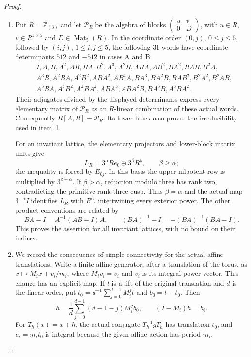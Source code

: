 \documentclass[11pt,a4paper]{article}
\theoremstyle{definition}
\begin{document}
\begin{proof}
\begin{enumerate}[label=\arabic*.]
\item Put $R=\mathbb Z_{(3)}$ and let $\mathcal P_R$ be the algebra
of blocks $\left(\begin{smallmatrix}u&v\\0&D\end{smallmatrix}\right)$,
with $u\in R$, $v\in R^{1\times5}$ and $D\in\operatorname{Mat}_5(R)$.
In the coordinate order $(0,j)$, $0\leq j\leq5$, followed by
$(i,j)$, $1\leq i,j\leq5$, the following $31$ words have coordinate
determinants $512$ and $-512$ in cases A and B:
\[
\begin{aligned}
&I,A,B,A^2,AB,BA,B^2,A^3,A^2B,ABA,AB^2,BA^2,BAB,B^2A,\\
&A^3B,A^2BA,A^2B^2,ABA^2,AB^2A,BA^3,BA^2B,BAB^2,B^2A^2,B^2AB,\\
&A^3BA,A^3B^2,A^2BA^2,ABA^3,ABA^2B,BA^3B,A^3BA^2.
\end{aligned}
\]
Their adjugates divided by the displayed determinants express
every elementary matrix of $\mathcal P_R$ as an $R$-linear
combination of these actual words.  Consequently $R[A,B]=\mathcal P_R$.
Its lower block also proves the irreducibility used in item~1.

For an invariant lattice, the elementary projectors and lower-block
matrix units give
\[
 L_R=3^\alpha Re_0\oplus3^\beta R^5,\qquad \beta\geq\alpha;
\]
the inequality is forced by $E_{0j}$.  In this basis the upper
nilpotent row is multiplied by $3^{\beta-\alpha}$.  If
$\beta>\alpha$, reduction modulo three has rank two, contradicting
the primitive rank-three cusp.  Thus $\beta=\alpha$ and the actual
map $3^{-\alpha}I$ identifies $L_R$ with $R^6$, intertwining every
exterior power.  The other product conventions are related by
\[
 BA-I=A^{-1}(AB-I)A,\qquad
 (BA)^{-1}-I=-(BA)^{-1}(BA-I).
\]
This proves the assertion for all invariant lattices, with no
bound on their indices.

\item We record the consequence of simple connectivity for the
actual affine translations.  Write a finite affine generator,
after a translation of the torus, as
$x\mapsto M_ix+v_i/m_i$, where $M_iv_i=v_i$ and $v_i$ is its
integral power vector.  This change has an explicit map.  If $t$
is a lift of the original translation and $d$ is the linear order,
put $t_0=d^{-1}\sum_{j=0}^{d-1}M_i^jt$ and $b_0=t-t_0$.
Then
\[
 h=\frac1d\sum_{j=0}^{d-1}(d-1-j)M_i^jb_0,
 \qquad (I-M_i)h=b_0.
\]
For $T_h(x)=x+h$, the actual conjugate $T_h^{-1}gT_h$ has translation $t_0$, and
$v_i=m_it_0$ is integral because the given affine action has
period $m_i$.


\end{enumerate}
\end{proof}
\end{document}
